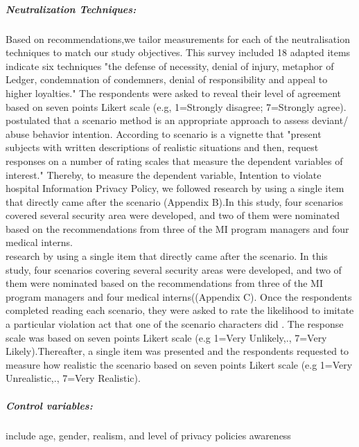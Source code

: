 \subparagraph{Neutralization Techniques:} Based on \cite{Siponen2010,Thurman1984} recommendations,we tailor measurements for each of the neutralisation techniques to match our study objectives. This survey included 18 adapted items indicate six techniques "the defense of necessity, denial of injury, metaphor of Ledger, condemnation of condemners, denial of responsibility and appeal to higher loyalties." The respondents were asked to reveal their level of agreement based on seven points Likert scale (e.g, 1=Strongly disagree; 7=Strongly agree). \\
\citet{Siponen2010} postulated that a scenario method is an appropriate approach to assess deviant/ abuse behavior intention. According to\cite{trevino1992experimental} scenario is a vignette that "present subjects with written descriptions of realistic situations and then, request responses on a number of rating scales that measure the dependent variables of interest." Thereby, to measure the dependent variable, Intention to violate hospital Information Privacy Policy, we followed \cite{Siponen2010,Teh2015} research by using a single item that  directly came after the scenario (Appendix B).In this study, four scenarios covered several security area were developed, and two of them were nominated based on the recommendations from three of the MI program managers and four medical interns. \\
research by using a single item that directly came after the scenario. In this study, four scenarios covering several security areas were developed, and two of them were nominated based on the recommendations from three of the MI program managers and four medical interns((Appendix C).
Once the respondents completed reading each scenario, they were asked to rate the likelihood to imitate a particular violation act that one of the scenario characters did \cite{Paternoster1996,Siponen2010}. The response scale was based on seven points Likert scale (e.g 1=Very Unlikely,., 7=Very Likely).Thereafter, a single item was presented and the respondents requested to measure how realistic the scenario based on seven points Likert scale (e.g 1=Very Unrealistic,., 7=Very Realistic).

\subparagraph {Control variables: } include age, gender, realism, and level of privacy policies awareness
 
